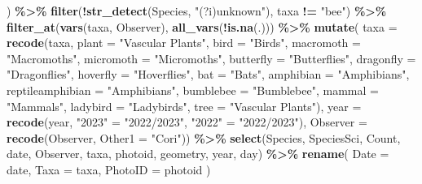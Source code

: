 \documentclass[
]{book}
\newenvironment{Shaded}{\begin{snugshade}}{\end{snugshade}}
\newcommand{\AttributeTok}[1]{\textcolor[rgb]{0.13,0.29,0.53}{#1}}
\newcommand{\FunctionTok}[1]{\textcolor[rgb]{0.13,0.29,0.53}{\textbf{#1}}}
\newcommand{\NormalTok}[1]{#1}
\newcommand{\OtherTok}[1]{\textcolor[rgb]{0.56,0.35,0.01}{#1}}
\newcommand{\SpecialCharTok}[1]{\textcolor[rgb]{0.81,0.36,0.00}{\textbf{#1}}}
\newcommand{\StringTok}[1]{\textcolor[rgb]{0.31,0.60,0.02}{#1}}
\begin{document}
\begin{Shaded}
\begin{Highlighting}[]
\NormalTok{  ) }\SpecialCharTok{\%\textgreater{}\%}
  \FunctionTok{filter}\NormalTok{(}\SpecialCharTok{!}\FunctionTok{str\_detect}\NormalTok{(Species, }\StringTok{"(?i)unknown"}\NormalTok{), taxa }\SpecialCharTok{!=} \StringTok{"bee"}\NormalTok{) }\SpecialCharTok{\%\textgreater{}\%}
  \FunctionTok{filter\_at}\NormalTok{(}\FunctionTok{vars}\NormalTok{(taxa, Observer), }\FunctionTok{all\_vars}\NormalTok{(}\SpecialCharTok{!}\FunctionTok{is.na}\NormalTok{(.))) }\SpecialCharTok{\%\textgreater{}\%}
  \FunctionTok{mutate}\NormalTok{(}
    \AttributeTok{taxa =} \FunctionTok{recode}\NormalTok{(taxa, }
                  \AttributeTok{plant =} \StringTok{"Vascular Plants"}\NormalTok{,}
                  \AttributeTok{bird =} \StringTok{"Birds"}\NormalTok{,}
                  \AttributeTok{macromoth =} \StringTok{"Macromoths"}\NormalTok{,}
                  \AttributeTok{micromoth =} \StringTok{"Micromoths"}\NormalTok{,}
                  \AttributeTok{butterfly =} \StringTok{"Butterflies"}\NormalTok{,}
                  \AttributeTok{dragonfly =} \StringTok{"Dragonflies"}\NormalTok{,}
                  \AttributeTok{hoverfly =} \StringTok{"Hoverflies"}\NormalTok{,}
                  \AttributeTok{bat =} \StringTok{"Bats"}\NormalTok{,}
                  \AttributeTok{amphibian =} \StringTok{"Amphibians"}\NormalTok{,}
                  \AttributeTok{reptileamphibian =} \StringTok{"Amphibians"}\NormalTok{,}
                  \AttributeTok{bumblebee =} \StringTok{"Bumblebee"}\NormalTok{,}
                  \AttributeTok{mammal =} \StringTok{"Mammals"}\NormalTok{,}
                  \AttributeTok{ladybird =} \StringTok{"Ladybirds"}\NormalTok{,}
                  \AttributeTok{tree =} \StringTok{"Vascular Plants"}\NormalTok{),}
    \AttributeTok{year =} \FunctionTok{recode}\NormalTok{(year,}
                  \StringTok{"2023"} \OtherTok{=} \StringTok{"2022/2023"}\NormalTok{,}
                  \StringTok{"2022"} \OtherTok{=} \StringTok{"2022/2023"}\NormalTok{),}
    \AttributeTok{Observer =} \FunctionTok{recode}\NormalTok{(Observer,}
                      \AttributeTok{Other1 =} \StringTok{"Cori"}\NormalTok{)) }\SpecialCharTok{\%\textgreater{}\%}
  \FunctionTok{select}\NormalTok{(Species, SpeciesSci, Count, date, Observer, taxa, photoid, geometry, year, day) }\SpecialCharTok{\%\textgreater{}\%}
  \FunctionTok{rename}\NormalTok{(}
    \AttributeTok{Date =}\NormalTok{ date,}
    \AttributeTok{Taxa =}\NormalTok{ taxa,}
    \AttributeTok{PhotoID =}\NormalTok{ photoid}
\NormalTok{  )}
\end{Highlighting}
\end{Shaded}
\end{document}
